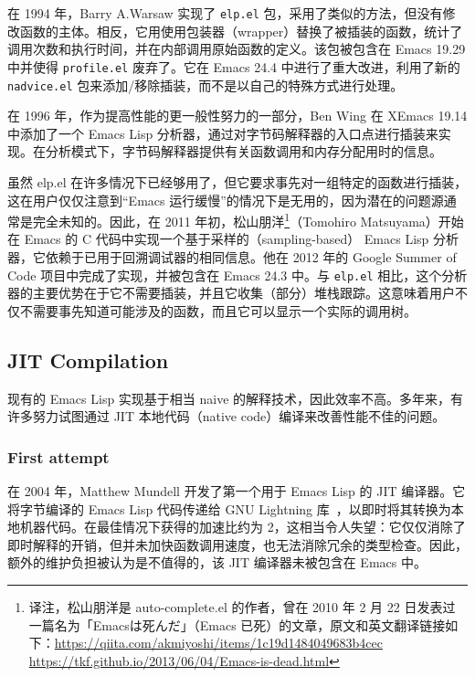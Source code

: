 \documentclass[format=acmsmall,screen]{acmart}
\begin{document}
在 1994 年，Barry A.Warsaw 实现了 \texttt{elp.el} 包，采用了类似的方法，但没有修改函数的主体。相反，它用使用包装器（wrapper）替换了被插装的函数，统计了调用次数和执行时间，并在内部调用原始函数的定义。该包被包含在 Emacs 19.29 中并使得 \texttt{profile.el} 废弃了。它在 Emacs 24.4 中进行了重大改进，利用了新的 \texttt{nadvice.el} 包来添加/移除插装，而不是以自己的特殊方式进行处理。

在 1996 年，作为提高性能的更一般性努力的一部分，Ben Wing 在 XEmacs 19.14 中添加了一个 Emacs Lisp 分析器，通过对字节码解释器的入口点进行插装来实现。在分析模式下，字节码解释器提供有关函数调用和内存分配用时的信息。

虽然 elp.el 在许多情况下已经够用了，但它要求事先对一组特定的函数进行插装，这在用户仅仅注意到“Emacs 运行缓慢”的情况下是无用的，因为潜在的问题源通常是完全未知的。因此，在 2011 年初，松山朋洋\footnote{译注，松山朋洋是 auto-complete.el 的作者，曾在 2010 年 2 月 22 日发表过一篇名为「Emacsは死んだ」（Emacs 已死）的文章，原文和英文翻译链接如下：\url{https://qiita.com/akmiyoshi/items/1c19d1484049683b4cec} \url{https://tkf.github.io/2013/06/04/Emacs-is-dead.html}}（Tomohiro Matsuyama）开始在 Emacs 的 C 代码中实现一个基于采样的（sampling-based） Emacs Lisp 分析器，它依赖于已用于回溯调试器的相同信息。他在 2012 年的 Google Summer of Code 项目中完成了实现，并被包含在 Emacs 24.3 中。与 \texttt{elp.el} 相比，这个分析器的主要优势在于它不需要插装，并且它收集（部分）堆栈跟踪。这意味着用户不仅不需要事先知道可能涉及的函数，而且它可以显示一个实际的调用树。

\subsection{JIT Compilation}
\label{sec:jit}

现有的 Emacs Lisp 实现基于相当 naive 的解释技术，因此效率不高。多年来，有许多努力试图通过 JIT 本地代码（native code）编译来改善性能不佳的问题。

\subsubsection*{First attempt}

在 2004 年，Matthew Mundell 开发了第一个用于 Emacs Lisp 的 JIT 编译器。它将字节编译的 Emacs Lisp 代码传递给 GNU Lightning 库~\cite{GNULightning}，以即时将其转换为本地机器代码。在最佳情况下获得的加速比约为 2，这相当令人失望：它仅仅消除了即时解释的开销，但并未加快函数调用速度，也无法消除冗余的类型检查。因此，额外的维护负担被认为是不值得的，该 JIT 编译器未被包含在 Emacs 中。
\end{document}

